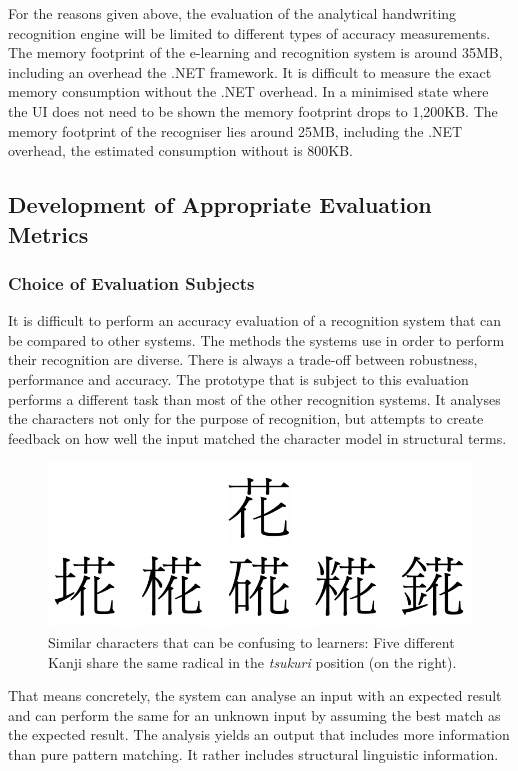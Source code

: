 For the reasons given above, the evaluation of the analytical handwriting 
recognition engine will be limited to different types of accuracy measurements.
The memory footprint of the e-learning and recognition system is around 35MB,
including an overhead the .NET framework. It is difficult to measure the
exact memory consumption without the .NET overhead. In a minimised state 
where the UI does not need to be shown the memory footprint drops to
1,200KB. The memory footprint of the recogniser lies around 25MB, including the
.NET overhead, the estimated consumption without is 800KB.

\subsection{Development of Appropriate Evaluation Metrics}
\label{sec:eval:developmentofevalmetrics}

\subsubsection{Choice of Evaluation Subjects}
\label{sec:eval:evaluationsubjects}
It is difficult to perform an accuracy evaluation of a recognition system
that can be compared to other systems. The methods the systems use in order
to perform their recognition are diverse. There is always a trade-off between
robustness, performance and accuracy.
The prototype that is subject to this evaluation performs a different
task than most of the other recognition systems. It analyses the characters
not only for the purpose of recognition, but attempts to create feedback on
how well the input matched the character model in structural terms.
\begin{figure}[htbp]
  \begin{center}
    \includegraphics[scale=0.4]{images/simlarCharaters.png}
    \caption{Similar characters that can be confusing to learners: Five different Kanji share the same radical in the \emph{tsukuri} position (on the right).}
    \label{fig:similarcharactersforuserconfusion}
  \end{center}
\end{figure}
That means concretely, the system can analyse an input with an expected result
and can perform the same for an unknown input by assuming the best match
as the expected result. The analysis yields an output that includes more
information than pure pattern matching. It rather includes structural linguistic 
information.


